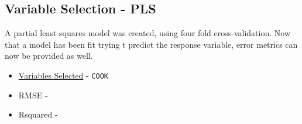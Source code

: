 \subsection*{Variable Selection - PLS}

A partial least squares model was created, using four fold cross-validation.  Now that a model has been fit trying t predict the response variable, error metrics can now be provided as well.  

\begin{itemize}
\item \hyperref[appendix:electricity:pls]{Variables Selected} - \lstinline{COOK}
\item RMSE - 
\item Rsquared -
\end{itemize}


